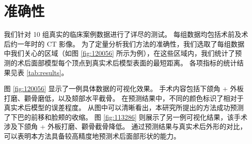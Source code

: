 \section{准确性}

我们针对 10 组真实的临床案例数据进行了详尽的测试。
每组数据均包括术前及术后约一年时的 CT 影像。
为了定量分析我们方法的准确性，我们选取了每组数据中我们关心的区域（如图 \ref{fig:120056} 所示为例），在这些区域内，我们统计了预测的术后面部模型每个顶点到真实术后模型表面的最短距离。
各项指标的统计结果见表 \ref{tab:results}。

图 \ref{fig:120056} 显示了一例具体数据的可视化效果。
手术内容包括下颌角 + 外板打磨、颧骨磨低，以及颏部水平截骨。
在预测结果中，不同的颜色标识了相对于真实术后模型的误差程度。
从图中可以清晰看出，本研究所提出的方法成功预测了下巴的前移和脸颊的收缩。
图 \ref{fig:113286} 则展示了另一例可视化结果，该手术涉及下颌角 + 外板打磨、颧骨截骨降低。
通过预测结果与真实术后外形的对比，可以表明本方法具备较高精度地预测术后面部形状的能力。

